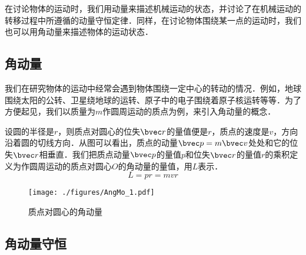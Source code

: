 
\begin{issues}
\issueTODO
\end{issues}

在讨论物体的运动时，我们用动量来描述机械运动的状态，并讨论了在机械运动的转移过程中所遵循的动量守恒定律．同样，在讨论物体围绕某一点的运动时，我们也可以用角动量来描述物体的运动状态．
\subsection{角动量}
我们在研究物体的运动中经常会遇到物体围绕一定中心的转动的情况．例如，地球围绕太阳的公转、卫星绕地球的运转、原子中的电子围绕着原子核运转等等．为了方便起见，我们以质量为$m$作圆周运动的质点为例，来引入角动量的概念．

设圆的半径是$r$，则质点对圆心的位失$\bvec r$的量值便是$r$，质点的速度是$v$，方向沿着圆的切线方向．从图可以看出，质点的动量$\bvec p = m\bvec v$处处和它的位失$\bvec r$相垂直．我们把质点动量$\bvec p$的量值$p$和位失$\bvec r$的量值$r$的乘积定义为作圆周运动的质点对圆心$O$的角动量的量值，用$L$表示．
\begin{equation}
L=pr=mvr
\end{equation}
\begin{figure}[ht]
\centering
\texttt{[image: ./figures/AngMo\_1.pdf]}
\caption{质点对圆心的角动量} \label{AngMo_fig1}
\end{figure}
\subsection{角动量守恒}



